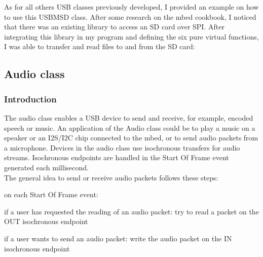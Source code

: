 \documentclass[pdftex,10pt,a4paper]{report}
\newenvironment{packed_item}{
\begin{itemize}
  \setlength{\itemsep}{1pt}
  \setlength{\parskip}{0pt}
  \setlength{\parsep}{0pt}
}{\end{itemize}}
\begin{document}
As for all others USB classes previously developed, I provided an example on how to use this USBMSD class. After some research on the mbed cookbook, I noticed that there was an existing library to access an SD card over SPI. After integrating this library in my program and defining the six pure virtual functions, I was able to transfer and read files to and from the SD card:
 


\subsection{Audio class}

\subsubsection{Introduction}
The audio class enables a USB device to send and receive, for example, encoded speech or music. An application of the Audio class could be to play a music on a speaker or an I2S/I2C chip connected to the mbed, or to send audio packets from a microphone. Devices in the audio class use isochronous transfers for audio streams. Isochronous endpoints are handled in the Start Of Frame event generated each millisecond. \\

The general idea to send or receive audio packets follows these steps:
\begin{packed_item}
	\item on each Start Of Frame event:
	\begin{packed_item}
		\item if a user has requested the reading of an audio packet: try to read a packet on the OUT isochronous endpoint
		\item if a user wants to send an audio packet: write the audio packet on the IN isochronous endpoint
	\end{packed_item}
\end{packed_item}
\end{document}
